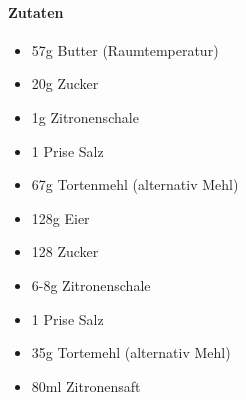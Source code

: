\newpage
{}

\paragraph{Zutaten}
\begin{itemize}[noitemsep]
	\item 57g Butter (Raumtemperatur)
	\item 20g Zucker
	\item 1g Zitronenschale
	\item 1 Prise Salz
	\item 67g Tortenmehl (alternativ Mehl)
	\vspace{0.5cm}
	\item 128g Eier
	\item 128 Zucker
	\item 6-8g Zitronenschale
	\item 1 Prise Salz
	\item 35g Tortemehl (alternativ Mehl)
	\item 80ml Zitronensaft
\end{itemize}


